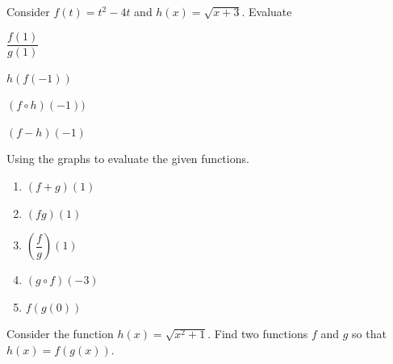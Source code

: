 \newpage

\begin{example}
  Consider $f(t)=t^2-4t$ and $h(x)=\sqrt{x+3}$. Evaluate\\ 
  \begin{enumerate*}
    \item $\dfrac{f(1)}{g(1)}$
    \item $h(f(-1))$
    \item $(f\circ h)(-1))$
    \item $(f-h)(-1)$
  \end{enumerate*}
\end{example}

\vspace*{2\baselineskip}

\begin{example}
  Using the graphs to evaluate the given functions.
  \begin{multicols}{2}
    \begin{enumerate}
      \item $(f+g)(1)$
      \item $(fg)(1)$
      \item $\left(\dfrac{f}{g}\right)(1)$
      \item $(g\circ f)(-3)$
      \item $f(g(0))$
    \end{enumerate}
    \columnbreak

  \end{multicols}
\end{example}
\vspace*{-0.1\textheight}

\begin{example}
  Consider the function $h(x)=\sqrt{x^2+1}$. Find two functions $f$ and $g$ so that $h(x)=f(g(x))$.
\end{example}

